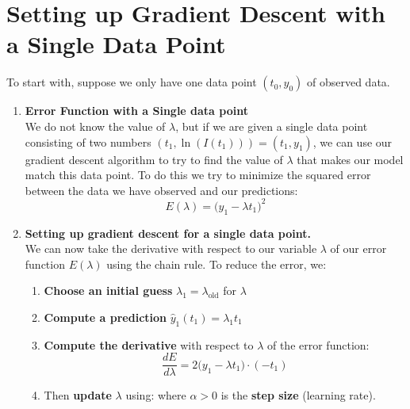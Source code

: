 \documentclass[11pt]{article}
\begin{document}
\section*{Setting up Gradient Descent with a Single Data Point}
To start with, suppose we only have one data point $(t_0,y_0)$ of observed data.
\begin{enumerate}

\item \textbf{Error Function with a Single data point}\\

We do not know the value of $\lambda$, but if we are given a single  data point consisting of two numbers $(t_1,\ln(I(t_1))) = (t_1,y_1)$,
we can use our gradient descent algorithm to try to find the value of $\lambda$ that makes our model match this data point. To do this we try to minimize the squared error between the data we have observed and our predictions:
\[
E(\lambda) = \big(y_1 - \lambda t_1\big)^2
\]
\item \textbf{Setting up gradient descent for a single data point.}\\
    We can now take the derivative with respect to our variable $\lambda$ of our error function $E(\lambda)$ using the chain rule.
    To reduce the error, we:
    \begin{enumerate}
    \item[(a)] \textbf{Choose an initial guess} $\lambda_1 = \lambda_{\text{old}}$ for $\lambda$\\
    \item[(b)] \textbf{Compute a prediction} $\hat{y}_1(t_1) = \lambda_1 t_1$\\

    \item[(c)] \textbf{Compute the derivative} with respect to $\lambda$ of the error function:
    \[
    \frac{dE}{d \lambda} = 2\big(y_1 - \lambda t_1\big) \cdot (-t_1)
    \]
    \item[(d)] Then \textbf{update} $\lambda$ using:
    where $\alpha > 0$ is the \textbf{step size} (learning rate).
    \end{enumerate}
    \vspace{0.5cm}
    

\end{enumerate}
\end{document}
